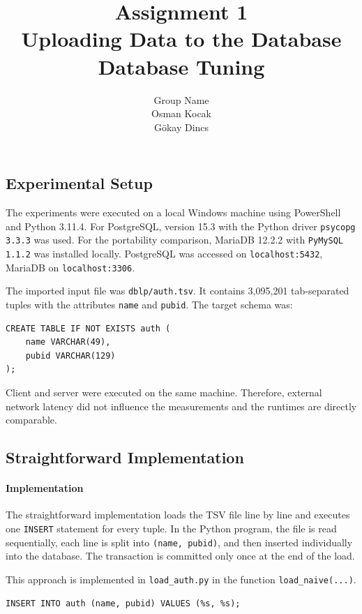 \documentclass[11pt]{scrartcl}
\title{
  \textbf{\large Assignment 1} \\
  Uploading Data to the Database \\
  {\large Database Tuning}}
\author{
  Group Name \\
  \large Osman Kocak \\
  \large Gökay Dincs \\
  
}
\begin{document}
\maketitle

\subsection*{Experimental Setup}

The experiments were executed on a local Windows machine using PowerShell and Python 3.11.4. For PostgreSQL, version 15.3 with the Python driver \texttt{psycopg 3.3.3} was used. For the portability comparison, MariaDB 12.2.2 with \texttt{PyMySQL 1.1.2} was installed locally. PostgreSQL was accessed on \texttt{localhost:5432}, MariaDB on \texttt{localhost:3306}.

The imported input file was \texttt{dblp/auth.tsv}. It contains 3,095,201 tab-separated tuples with the attributes \texttt{name} and \texttt{pubid}. The target schema was:

\begin{lstlisting}[style=dbtsql]
CREATE TABLE IF NOT EXISTS auth (
    name VARCHAR(49),
    pubid VARCHAR(129)
);
\end{lstlisting}

Client and server were executed on the same machine. Therefore, external network latency did not influence the measurements and the runtimes are directly comparable.

\subsection*{Straightforward Implementation}

\paragraph{Implementation}

The straightforward implementation loads the TSV file line by line and executes one \texttt{INSERT} statement for every tuple. In the Python program, the file is read sequentially, each line is split into \texttt{(name, pubid)}, and then inserted individually into the database. The transaction is committed only once at the end of the load.

This approach is implemented in \texttt{load\_auth.py} in the function \texttt{load\_naive(...)}.

\begin{lstlisting}[style=dbtsql]
INSERT INTO auth (name, pubid) VALUES (%s, %s);
\end{lstlisting}
\end{document}
